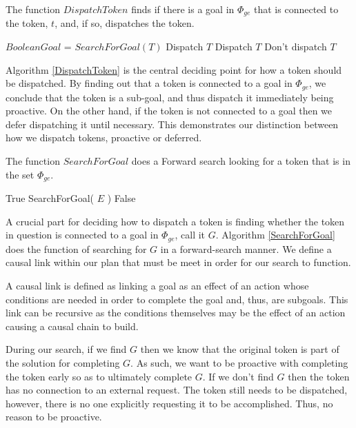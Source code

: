\begin{algorithm}
\caption{The function $DispatchToken$ finds if there is a goal in $\Phi_{ge}$ that is connected
to the token, $t$, and, if so, dispatches the token.}
\label{DispatchToken}
\begin{algorithmic}
\State $Boolean Goal$ = $SearchForGoal( T )$
	\State \Return Dispatch $T$
	\State \Return Dispatch $T$
\Else
	\State \Return Don't dispatch $T$
\EndIf
\EndFunction
\end{algorithmic}
\end{algorithm}

Algorithm \ref{DispatchToken} is the central deciding point for how a token 
should be dispatched. By finding out that a token is connected to a goal in $\Phi_{ge}$, we conclude 
that the token is a sub-goal, and thus dispatch it immediately being proactive. 
On the other hand, if the token is not connected to a goal then we defer dispatching it until necessary. 
This demonstrates our distinction between how we dispatch tokens, proactive or deferred. 

\begin{algorithm}
\caption{The function $SearchForGoal$ does a Forward search looking for a token that is
in the set $\Phi_{ge}$.}
\label{SearchForGoal}
\begin{algorithmic}
			\State \Return True
			\State \Return SearchForGoal( $E$ )
		\Else 
			\State \Return False
		\EndIf
	\EndFor
\EndFor
\EndFunction
\end{algorithmic}
\end{algorithm}

A crucial part for deciding how to dispatch a token is finding whether the token in question is 
connected to a goal in $\Phi_{ge}$, call it $G$. Algorithm \ref{SearchForGoal} does the function of 
searching for $G$ in a forward-search manner. We define a causal link within our plan that must be
meet in order for our search to function. 
\begin{definition}
\label{def:subgoalLink}
A causal link is defined as linking a goal as an effect of an action whose conditions are needed in order
to complete the goal and, thus, are subgoals. This link can be recursive as the conditions themselves 
may be the effect of an action causing a causal chain to build.
\end{definition}
During our search, if we find $G$ then we know that the original token is part of the solution for completing $G$. 
As such, we want to be proactive with completing the token early so as to ultimately complete $G$. If we don't 
find $G$ then the token has no connection to an external request. The token still needs to be dispatched, 
however, there is no one explicitly requesting it to be accomplished. Thus, no reason to be proactive. 

